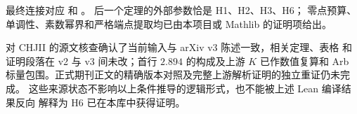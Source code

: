 最终连接对应  和
。
后一个定理的外部参数恰是 H1、H2、H3、H6；
零点预算、单调性、素数幂界和严格端点提取均已由本项目或 Mathlib 的证明项给出。

\begin{remark}\label{tail:source-boundary}
对 CHJII 的源文核查确认了当前输入与 arXiv v3 陈述一致，相关定理、表格
和证明段落在 v2 与 v3 间未改；首行 $2.894$ 的构成及上游 $K$ 已作数值复算和
Arb 标量包围。正式期刊正文的精确版本对照及完整上游解析证明的独立重证仍未完成。
这些来源状态不影响以上条件推导的逻辑形式，也不能被上述 Lean 编译结果反向
解释为 H6 已在本库中获得证明。
\end{remark}
